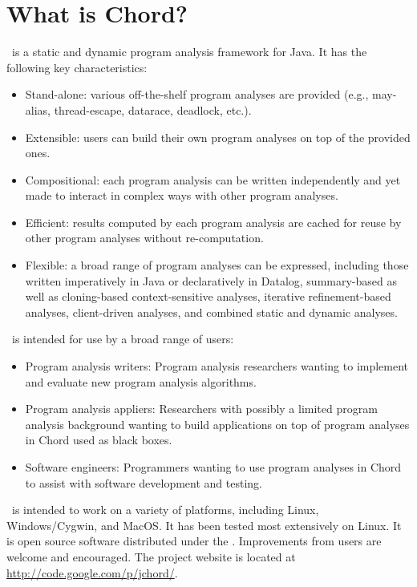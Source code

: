 \section{What is Chord?}
\label{sec:whatis-chord}

\Chord\ is a static and dynamic program analysis framework for Java.
It has the following key characteristics:

\begin{itemize}
\item
Stand-alone: various off-the-shelf program analyses are provided (e.g., may-alias, thread-escape, datarace, deadlock, etc.).
\item
Extensible: users can build their own program analyses on top of the provided ones.
\item
Compositional: each program analysis can be written independently and yet made to interact in complex ways with other program analyses.
\item
Efficient: results computed by each program analysis are cached for reuse by other program analyses without re-computation.
\item
Flexible: a broad range of program analyses can be expressed, including those
written imperatively in Java or declaratively in Datalog, summary-based as well as cloning-based context-sensitive analyses,
iterative refinement-based analyses, client-driven analyses, and combined static and dynamic analyses.
\end{itemize}

\noindent \Chord\ is intended for use by a broad range of users:

\begin{itemize}
\item
Program analysis writers: Program analysis researchers wanting to implement and evaluate new program analysis algorithms.
\item
Program analysis appliers: Researchers with possibly a limited program analysis background wanting to build applications on
top of program analyses in Chord used as black boxes.
\item
Software engineers: Programmers wanting to use program analyses in Chord to assist with software development and testing.
\end{itemize}

\noindent \Chord\ is intended to work on a variety of platforms, including Linux, Windows/Cygwin, and MacOS.
It has been tested most extensively on Linux.
It is open source software distributed under the .
Improvements from users are welcome and encouraged.
The project website is located at \url{http://code.google.com/p/jchord/}.


